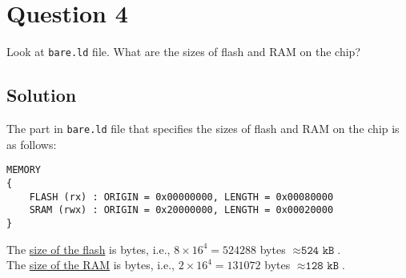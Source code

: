 \section*{Question 4}

Look at \texttt{bare.ld} file.
What are the sizes of flash and RAM on the chip?

\subsection*{Solution}

The part in \texttt{bare.ld} file that specifies the sizes of flash and RAM on the chip is as follows:
\begin{verbatim}
MEMORY
{
    FLASH (rx) : ORIGIN = 0x00000000, LENGTH = 0x00080000
    SRAM (rwx) : ORIGIN = 0x20000000, LENGTH = 0x00020000
}
\end{verbatim}
The \underline{size of the flash} is  bytes, i.e., \(8\times 16^4 = 524288\) bytes \(\approx \boxed{\texttt{524 kB}}\).\\
The \underline{size of the RAM} is  bytes, i.e., \(2\times 16^4 = 131072\) bytes \(\approx \boxed{\texttt{128 kB}}\).
